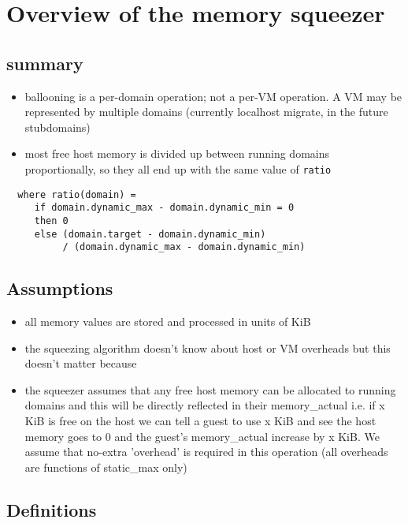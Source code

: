 \chapter{Overview of the memory squeezer}
\section{summary}
\begin{itemize}
\item ballooning is a per-domain operation; not a per-VM operation. A VM may be represented by multiple domains
  (currently localhost migrate, in the future stubdomains)
\item most free host memory is divided up between running domains proportionally, so they all end up with the same
  value of {\tt ratio}
\end{itemize}

\begin{verbatim}
  where ratio(domain) = 
     if domain.dynamic_max - domain.dynamic_min = 0 
     then 0 
     else (domain.target - domain.dynamic_min) 
          / (domain.dynamic_max - domain.dynamic_min)
\end{verbatim}

\section{Assumptions}
\begin{itemize}
\item all memory values are stored and processed in units of KiB
\item the squeezing algorithm doesn't know about host or VM overheads but this doesn't matter because
\item the squeezer assumes that any free host memory can be allocated to running domains and this will be directly reflected in their memory\_actual i.e. if x KiB is free on the host we can tell a guest to use x KiB and see the host memory goes to 0 and the guest's memory\_actual increase by x KiB. We assume that no-extra 'overhead' is required in this operation (all overheads are functions of static\_max only)
\end{itemize}

\section{Definitions}

